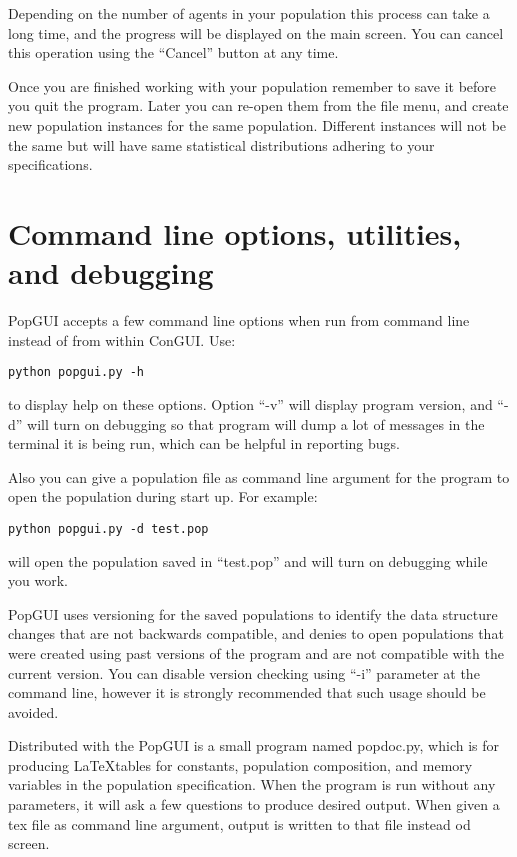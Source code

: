 Depending on the number of agents in your population this process can take a long time, and the progress will be displayed on the main screen. You can cancel this operation using the ``Cancel'' button at any time.

Once you are finished working with your population remember to save it before you quit the program. Later you can re-open them from the file menu, and create new population instances for the same population. Different instances will not be the same but will have same statistical distributions adhering to your specifications.

\section{Command line options, utilities, and debugging}
\label{sec:cmdline}
PopGUI accepts a few command line options when run from command line instead of from within ConGUI. Use:
\begin{verbatim}
python popgui.py -h
\end{verbatim}
to display help on these options. Option ``-v'' will display program version, and ``-d'' will turn on debugging so that program will dump a lot of messages in the terminal it is being run, which can be helpful in reporting bugs. 

Also you can give a population file as command line argument for the program to open the population during start up. For example:
\begin{verbatim}
python popgui.py -d test.pop
\end{verbatim}
will open the population saved in ``test.pop'' and will turn on debugging while you work.

PopGUI uses versioning for the saved populations to identify the data structure changes that are not backwards compatible, and denies to open populations that were created using past versions of the program and are not compatible with the current version. You can disable version checking using ``-i'' parameter at the command line, however it is strongly recommended that such usage should be avoided.

Distributed with the PopGUI is a small program named popdoc.py, which  is for producing \LaTeX tables for constants, population composition, and memory variables in the population specification. When the program is run without any parameters, it will ask a few questions to produce desired output. When given a tex file as command line argument, output is written to that file instead od screen.


